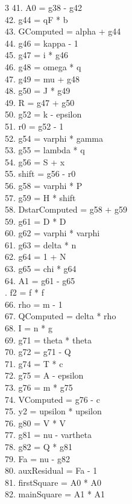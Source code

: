 \documentclass[10pt]{article}
\begin{document}
\begin{multicols}{3}
41. A0 = g38 - g42\\
42. g44 = qF * b\\
43. GComputed = alpha + g44\\
44. g46 = kappa - 1\\
45. g47 = i * g46\\
46. g48 = omega * q\\
47. g49 = mu + g48\\
48. g50 = J * g49\\
49. R = g47 + g50\\
50. g52 = k - epsilon\\
51. r0 = g52 - 1\\
52. g54 = varphi * gamma\\
53. g55 = lambda * q\\
54. g56 = S + x\\
55. shift = g56 - r0\\
56. g58 = varphi * P\\
57. g59 = H * shift\\
58. DstarComputed = g58 + g59\\
59. g61 = D * D\\
60. g62 = varphi * varphi\\
61. g63 = delta * n\\
62. g64 = 1 + N\\
63. g65 = chi * g64\\
64. A1 = g61 - g65\\
. f2 = f * f\\
66. rho = m - 1\\
67. QComputed = delta * rho\\
68. I = n * g\\
69. g71 = theta * theta\\
70. g72 = g71 - Q\\
71. g74 = T * c\\
72. g75 = A - epsilon\\
73. g76 = m * g75\\
74. VComputed = g76 - c\\
75. y2 = upsilon * upsilon\\
76. g80 = V * V\\
77. g81 = nu - vartheta\\
78. g82 = Q * g81\\
79. Fa = nu - g82\\
80. auxResidual = Fa - 1\\
81. firstSquare = A0 * A0\\
82. mainSquare = A1 * A1\\

\end{multicols}
\end{document}
